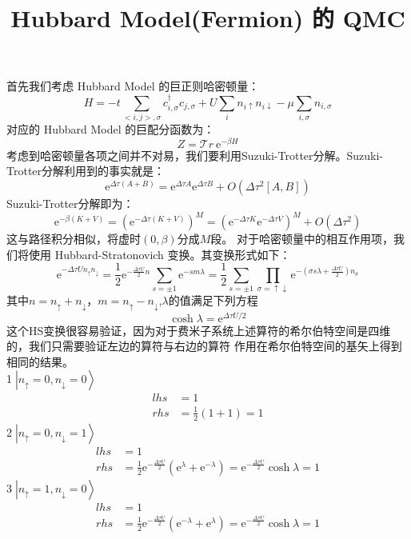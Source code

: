 \documentclass[UTF8,cs4size]{ctexart}
\title{Hubbard Model(Fermion) 的 QMC}
\author{}
\date{}
\def\ee{\mathrm e}
\begin{document}
\maketitle
{}
首先我们考虑 Hubbard Model 的巨正则哈密顿量：
\[
    H=-t \sum_{<i,j>,\sigma} c^{\dag}_{i,\sigma}c_{j,\sigma} + U \sum_{i} n_{i\uparrow} n_{i\downarrow}
    -\mu \sum_{i,\sigma} n_{i,\sigma}
\]
对应的 Hubbard Model 的巨配分函数为：
\[
    Z=\mathcal{T}r \  \ee^{-\beta H}   
\]
考虑到哈密顿量各项之间并不对易，我们要利用Suzuki-Trotter分解。Suzuki-Trotter分解利用到的事实就是：
\[
    \ee^{\Delta \tau (A+B)}=\ee^{\Delta \tau A} \ee^{\Delta \tau B} +O(\Delta \tau^2 [A,B])    
\]
Suzuki-Trotter分解即为：
\[
    \ee^{-\beta (K+V)}  = (\ee^{-\Delta \tau (K+V)})^M =(\ee^{-\Delta \tau K} \ee^{-\Delta \tau V})^M
    +O(\Delta \tau^2)
\]
这与路径积分相似，将虚时$(0,\beta)$分成$M$段。
对于哈密顿量中的相互作用项，我们将使用 Hubbard-Stratonovich 变换。其变换形式如下：
\[
    \ee^{-\Delta \tau U n_{\uparrow} n_{\downarrow}} =\frac{1}{2} \ee^{-\frac{\Delta \tau U}{2}n}
    \sum_{s=\pm 1} \ee^{-sm\lambda} = \frac{1}{2} \sum_{s=\pm 1} \prod_{\sigma = \uparrow \downarrow}
    \ee^{-\left(\sigma s \lambda + \frac{\Delta \tau U}{2}\right)n_{\sigma}}    
\]
其中$n=n_{\uparrow} + n_{\downarrow}$，$m=n_{\uparrow} - n_{\downarrow}$,$\lambda$的值满足下列方程
\[
    \cosh \lambda = \ee^{\Delta \tau U /2}    
\]
这个HS变换很容易验证，因为对于费米子系统上述算符的希尔伯特空间是四维的，我们只需要验证左边的算符与右边的算符
作用在希尔伯特空间的基矢上得到相同的结果。\\
\textcircled{1}$\left| n_{\uparrow}=0,n_{\downarrow}=0 \right>$
\[
    \begin{aligned}
        lhs&=1\\
        rhs&=\frac{1}{2}(1+1)=1
    \end{aligned}    
\]
\textcircled{2}$\left| n_{\uparrow}=0,n_{\downarrow}=1 \right>$
\[
    \begin{aligned}
        lhs&=1\\
        rhs&=\frac{1}{2}\ee^{-\frac{\Delta \tau U}{2}}\left(\ee^{\lambda} + \ee^{-\lambda}\right)
        =\ee^{-\frac{\Delta \tau U}{2}} \cosh \lambda =1
    \end{aligned}    
\]
\textcircled{3}$\left| n_{\uparrow}=1,n_{\downarrow}=0 \right>$
\[
    \begin{aligned}
        lhs&=1\\
        rhs&=\frac{1}{2}\ee^{-\frac{\Delta \tau U}{2}}\left(\ee^{-\lambda} + \ee^{\lambda}\right)
        =\ee^{-\frac{\Delta \tau U}{2}} \cosh \lambda =1
    \end{aligned}    
\]
\end{document}
